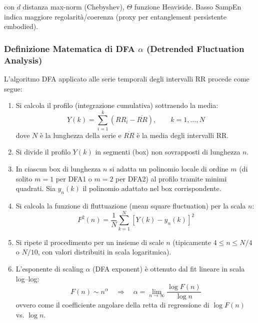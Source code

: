\documentclass[11pt,a4paper]{article}
\theoremstyle{plain}
\theoremstyle{definition}
\begin{document}
con $d$ distanza max-norm (Chebyshev), $\Theta$ funzione Heaviside. Basso SampEn indica maggiore regolarità/coerenza (proxy per entanglement persistente embodied).

\vspace{0.3cm}

\subsubsection{Definizione Matematica di DFA $\alpha$ (Detrended Fluctuation Analysis)}

L'algoritmo DFA applicato alle serie temporali degli intervalli RR procede come segue:

\begin{enumerate}
    \item Si calcola il profilo (integrazione cumulativa) sottraendo la media:
    \[
    Y(k) = \sum_{i=1}^{k} (RR_i - \overline{RR}), \qquad k = 1, \dots, N
    \]
    dove $N$ è la lunghezza della serie e $\overline{RR}$ è la media degli intervalli RR.

    \item Si divide il profilo $Y(k)$ in segmenti (box) non sovrapposti di lunghezza $n$.

    \item In ciascun box di lunghezza $n$ si adatta un polinomio locale di ordine $m$ (di solito $m=1$ per DFA1 o $m=2$ per DFA2) al profilo tramite minimi quadrati. Sia $y_n(k)$ il polinomio adattato nel box corrispondente.

    \item Si calcola la funzione di fluttuazione (mean square fluctuation) per la scala $n$:
    \[
    F^2(n) = \frac{1}{N} \sum_{k=1}^{N} \left[ Y(k) - y_n(k) \right]^2
    \]

    \item Si ripete il procedimento per un insieme di scale $n$ (tipicamente $4 \leq n \leq N/4$ o $N/10$, con valori distribuiti in scala logaritmica).

    \item L'esponente di scaling $\alpha$ (DFA exponent) è ottenuto dal fit lineare in scala log–log:
    \[
    F(n) \sim n^{\alpha} \quad \Rightarrow \quad \alpha = \lim_{n \to \infty} \frac{\log F(n)}{\log n}
    \]
    ovvero come il coefficiente angolare della retta di regressione di $\log F(n)$ vs. $\log n$.
\end{enumerate}

\vspace{0.3cm}
\end{document}
